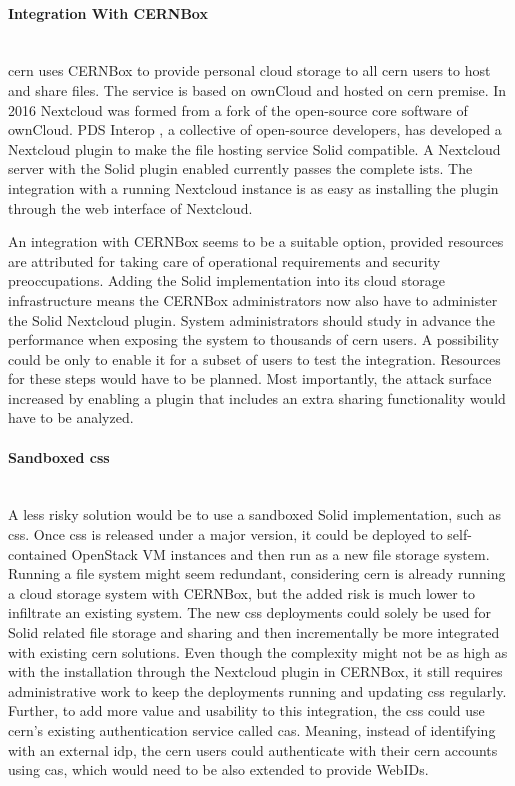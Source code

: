 \paragraph{Integration With CERNBox}\mbox{}\\

\gls{cern} uses CERNBox \cite{cernbox} to provide personal cloud storage to all \gls{cern} users to host and share files. The service is based on ownCloud \cite{owncloud} and hosted on \gls{cern} premise. In 2016 Nextcloud \cite{nextcloud} was formed from a fork of the open-source core software of ownCloud. PDS Interop \cite{pds-interop}, a collective of open-source developers, has developed a Nextcloud \cite{nextcloud} plugin to make the file hosting service Solid compatible. A Nextcloud server with the Solid plugin enabled currently passes the complete \gls{ists}. The integration with a running Nextcloud instance is as easy as installing the plugin through the web interface of Nextcloud.

An integration with CERNBox seems to be a suitable option, provided resources are attributed for taking care of operational requirements and security preoccupations. Adding the Solid implementation into its cloud storage infrastructure means the CERNBox administrators now also have to administer the Solid Nextcloud plugin. System administrators should study in advance the performance when exposing the system to thousands of \gls{cern} users. A possibility could be only to enable it for a subset of users to test the integration. Resources for these steps would have to be planned. Most importantly, the attack surface increased by enabling a plugin that includes an extra sharing functionality would have to be analyzed.
\vspace{0.5cm}
\paragraph{Sandboxed \gls{css}}\mbox{}\\

A less risky solution would be to use a sandboxed Solid implementation, such as \gls{css}. Once \gls{css} is released under a major version, it could be deployed to self-contained OpenStack VM instances and then run as a new file storage system. Running a file system might seem redundant, considering \gls{cern} is already running a cloud storage system with CERNBox, but the added risk is much lower to infiltrate an existing system. The new \gls{css} deployments could solely be used for Solid related file storage and sharing and then incrementally be more integrated with existing \gls{cern} solutions. Even though the complexity might not be as high as with the installation through the Nextcloud plugin in CERNBox, it still requires administrative work to keep the deployments running and updating \gls{css} regularly. Further, to add more value and usability to this integration, the \gls{css} could use \gls{cern}'s existing authentication service called \gls{cas}. Meaning, instead of identifying with an external \gls{idp}, the \gls{cern} users could authenticate with their \gls{cern} accounts using \gls{cas}, which would need to be also extended to provide WebIDs.

